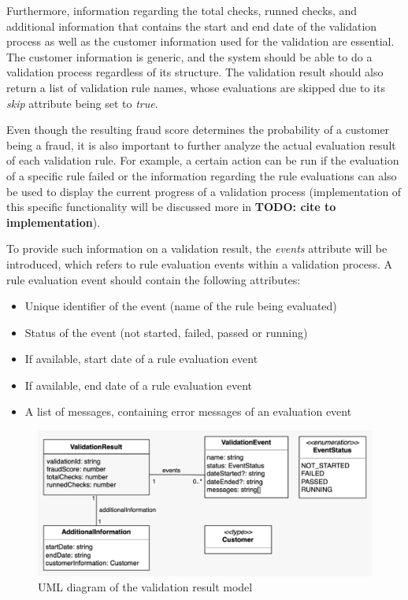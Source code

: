 Furthermore, information regarding the total checks, runned checks, and additional information that contains the start and end date of the validation process as well as the customer information used for the validation are essential. The customer information is generic, and the system should be able to do a validation process regardless of its structure. The validation result should also return a list of validation rule names, whose evaluations are skipped due to its \emph{skip} attribute being set to \emph{true}.

Even though the resulting fraud score determines the probability of a customer being a fraud, it is also important to further analyze the actual evaluation result of each validation rule. For example, a certain action can be run if the evaluation of a specific rule failed or the information regarding the rule evaluations can also be used to display the current progress of a validation process (implementation of this specific functionality will be discussed more in \textbf{TODO: cite to implementation}). 

To provide such information on a validation result, the \emph{events} attribute will be introduced, which refers to rule evaluation events within a validation process. A rule evaluation event should contain the following attributes:

\begin{itemize}
  \item Unique identifier of the event (name of the rule being evaluated)
  \item Status of the event (not started, failed, passed or running) 
  \item If available, start date of a rule evaluation event 
  \item If available, end date of a rule evaluation event 
  \item A list of messages, containing error messages of an evaluation event
\end{itemize}

\begin{figure}[!ht]
  \includegraphics[width=\textwidth]{diagrams/entity_validation_result.jpeg}
  \caption{UML diagram of the validation result model}
 \end{figure}
 
